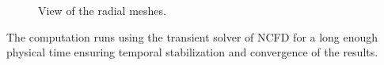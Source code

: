 \begin{figure}[!h]
\centering
{}
\caption{View of the radial meshes.}
\label{fig:deb_cfd_msh_rad}
\end{figure}


\npar

The computation runs using the transient solver of NCFD for a long enough physical time ensuring temporal stabilization and convergence of the results. 

